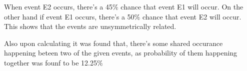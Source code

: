 \documentclass{article}
\begin{document}
\begin{enumerate}
\begin{enumerate}
    \textnormal{When event E2 occurs, there's a 45\% chance that event E1 will occur. On the other hand if event E1 occurs, there's a 50\% chance that event E2 will occur.}
    \textnormal{This shows that the events are unsymmetrically related.}
    
    \textnormal{Also upon calculating it was found that, there's some shared occurance happening beteen two of the given events,}
    \textnormal{as probability of them happening together was founf to be 12.25\%}
  \end{enumerate}

\end{enumerate}
\end{document}
